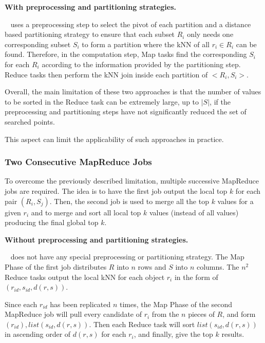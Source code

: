 \documentclass[10pt,journal,compsoc]{IEEEtran}
\newcommand{\VO}{{\bf PGBJ}}
\newcommand{\HBNLJ}{{\bf H-BNLJ}}
\begin{document}
\vspace{0.3em}

\noindent \textbf{With preprocessing and partitioning strategies.} 

\noindent \VO~ \cite{Lu:2012:EPK:2336664.2336674} uses a preprocessing step to select the pivot of each partition and a distance based partitioning 
strategy to ensure that each subset $R_i$ only needs one corresponding subset $S_i$ to form a partition where the kNN of all $r_i \in R_i$ can 
be found. Therefore, in the computation step, Map tasks find the corresponding $S_i$ for each $R_i$ according to the information provided by 
the partitioning step. Reduce tasks then perform the kNN join inside each partition of $<R_i, S_i>$.


Overall, the main limitation of these two approaches is that the number of values to be sorted in the Reduce task
can be extremely large, up to $\left|S\right|$, if the
preprocessing and partitioning steps have not significantly reduced the set of searched points.

This aspect can limit the applicability of such approaches in practice. 


\subsubsection{Two Consecutive MapReduce Jobs}
To overcome the previously described limitation, multiple successive MapReduce jobs are required. The idea is to have the first job output the local top $k$ for each pair $(R_i, S_j)$. Then, the second job is used to merge all the top $k$ values for a given $r_i$ and to merge and sort all local top $k$ values (instead of all values) producing the final global top $k$.

\vspace{0.3em}

\noindent \textbf{Without preprocessing and partitioning strategies.} 

\noindent \HBNLJ~ does not have any special preprocessing or partitioning strategy. The Map Phase of the first job distributes $R$ into $n$ rows and $S$ into $n$ columns. The $n^2$ Reduce tasks output the local kNN for each object $r_i$ in the form of $(r_{id}, s_{id}, d(r, s))$.

Since each $r_{id}$ has been replicated $n$ times, the Map Phase of the second MapReduce job will pull every candidate of $r_i$ from the $n$ pieces of $R$, and form $(r_{id}), list(s_{id}, d(r, s))$. Then each Reduce task will sort $list(s_{id}, d(r, s))$ in ascending order of $d(r, s)$ for each $r_i$, and finally, give the top $k$ results.
\end{document}
